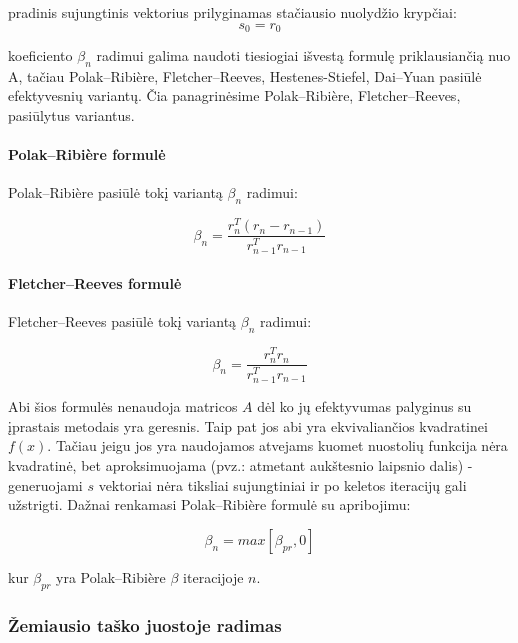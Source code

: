 \documentclass{VUMIFPSmagistrinis}
\begin{document}
pradinis sujungtinis vektorius prilyginamas stačiausio nuolydžio krypčiai:
\begin{equation}
	s_{0} = r_{0}
\end{equation}

koeficiento $\beta_{n}$ radimui galima naudoti tiesiogiai išvestą formulę priklausiančią nuo A, tačiau Polak–Ribière, Fletcher–Reeves, Hestenes-Stiefel, Dai–Yuan pasiūlė efektyvesnių variantų.
Čia panagrinėsime Polak–Ribière, Fletcher–Reeves, pasiūlytus variantus.

\paragraph{Polak–Ribière formulė}
Polak–Ribière pasiūlė tokį variantą $\beta_{n}$ radimui:

\begin{equation}
	\beta_{n} = \dfrac {r_{n}^{T} (r_{n} - r_{n-1})} {r_{n-1}^{T} r_{n-1} }
\end{equation}

\paragraph{Fletcher–Reeves formulė}
Fletcher–Reeves pasiūlė tokį variantą $\beta_{n}$ radimui:

\begin{equation}
	\beta_{n} = \dfrac {r_{n}^{T} r_{n} } {r_{n-1}^{T} r_{n-1} }
\end{equation}

Abi šios formulės nenaudoja matricos $A$ dėl ko jų efektyvumas palyginus su įprastais metodais yra geresnis.
Taip pat jos abi yra ekvivaliančios kvadratinei $f(x)$.
Tačiau jeigu jos yra naudojamos atvejams kuomet nuostolių funkcija nėra kvadratinė, bet aproksimuojama (pvz.: atmetant aukštesnio laipsnio dalis) - generuojami $s$ vektoriai nėra tiksliai sujungtiniai ir po keletos iteracijų gali užstrigti.
Dažnai renkamasi Polak–Ribière formulė su apribojimu:

\begin{equation}
	\beta_{n} = max [ \beta_{pr}, 0 ]
\end{equation}

kur $\beta_{pr}$ yra Polak–Ribière $\beta$ iteracijoje $n$.

\subsubsection{Žemiausio taško juostoje radimas}
\end{document}
